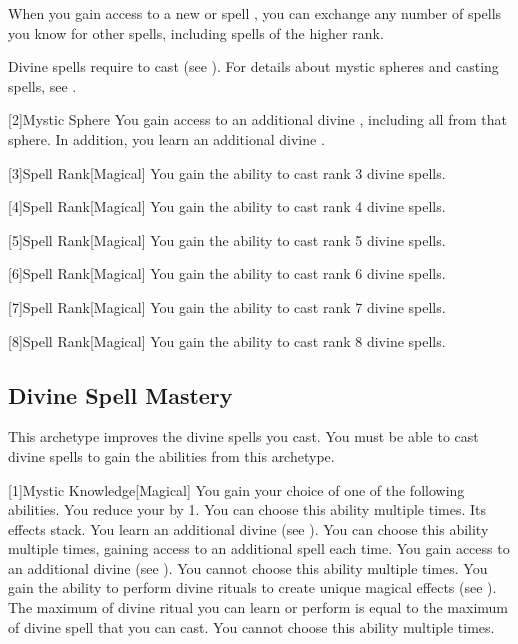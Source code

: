         When you gain access to a new  or spell ,
            you can exchange any number of spells you know for other spells,
            including spells of the higher rank.

        Divine spells require  to cast (see ).
        For details about mystic spheres and casting spells, see .

        [2]{Mystic Sphere} You gain access to an additional divine , including all  from that sphere.
        In addition, you learn an additional divine .

        [3]{Spell Rank}[Magical] You gain the ability to cast rank 3 divine spells.

        [4]{Spell Rank}[Magical] You gain the ability to cast rank 4 divine spells.

        [5]{Spell Rank}[Magical] You gain the ability to cast rank 5 divine spells.

        [6]{Spell Rank}[Magical] You gain the ability to cast rank 6 divine spells.

        [7]{Spell Rank}[Magical] You gain the ability to cast rank 7 divine spells.

        [8]{Spell Rank}[Magical] You gain the ability to cast rank 8 divine spells.

    \subsection{Divine Spell Mastery}
        This archetype improves the divine spells you cast.
        You must be able to cast divine spells to gain the abilities from this archetype.

        [1]{Mystic Knowledge}[Magical]
        You gain your choice of one of the following abilities.
        {
             You reduce your  by 1.
                You can choose this ability multiple times.
                Its effects stack.
             You learn an additional divine  (see ).
                You can choose this ability multiple times, gaining access to an additional spell each time.
             You gain access to an additional divine  (see ).
                You cannot choose this ability multiple times.
             You gain the ability to perform divine rituals to create unique magical effects (see ).
                The maximum  of divine ritual you can learn or perform is equal to the maximum  of divine spell that you can cast.
                You cannot choose this ability multiple times.
        }

